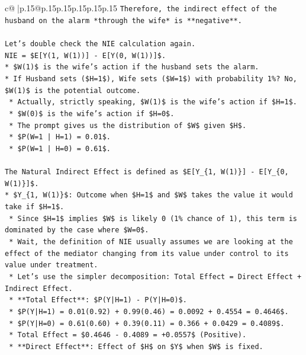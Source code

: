 \documentclass{article}
\begin{document}
{\begin{supertabular}{c@{$\;$}|p{.15\linewidth}@{}p{.15\linewidth}p{.15\linewidth}p{.15\linewidth}p{.15\linewidth}p{.15\linewidth}}
{{{\texttt{Therefore, the indirect effect of the husband on the alarm *through the wife* is **negative**.} \\
\\ 
\texttt{Let's double check the NIE calculation again.} \\
\texttt{NIE = \$E{[}Y(1, W(1)){]} {-} E{[}Y(0, W(1)){]}\$.} \\
\texttt{*   \$W(1)\$ is the wife's action if the husband sets the alarm.} \\
\texttt{*   If Husband sets (\$H=1\$), Wife sets (\$W=1\$) with probability 1\%? No, \$W(1)\$ is the potential outcome.} \\
\texttt{    *   Actually, strictly speaking, \$W(1)\$ is the wife's action if \$H=1\$.} \\
\texttt{    *   \$W(0)\$ is the wife's action if \$H=0\$.} \\
\texttt{    *   The prompt gives us the distribution of \$W\$ given \$H\$.} \\
\texttt{    *   \$P(W=1 | H=1) = 0.01\$.} \\
\texttt{    *   \$P(W=1 | H=0) = 0.61\$.} \\
\\ 
\texttt{The Natural Indirect Effect is defined as \$E{[}Y\_\{1, W(1)\}{]} {-} E{[}Y\_\{0, W(1)\}{]}\$.} \\
\texttt{*   \$Y\_\{1, W(1)\}\$: Outcome when \$H=1\$ and \$W\$ takes the value it would take if \$H=1\$.} \\
\texttt{    *   Since \$H=1\$ implies \$W\$ is likely 0 (1\% chance of 1), this term is dominated by the case where \$W=0\$.} \\
\texttt{    *   Wait, the definition of NIE usually assumes we are looking at the effect of the mediator changing from its value under control to its value under treatment.} \\
\texttt{    *   Let's use the simpler decomposition: Total Effect = Direct Effect + Indirect Effect.} \\
\texttt{    *   **Total Effect**: \$P(Y|H=1) {-} P(Y|H=0)\$.} \\
\texttt{        *   \$P(Y|H=1) = 0.01(0.92) + 0.99(0.46) = 0.0092 + 0.4554 = 0.4646\$.} \\
\texttt{        *   \$P(Y|H=0) = 0.61(0.60) + 0.39(0.11) = 0.366 + 0.0429 = 0.4089\$.} \\
\texttt{        *   Total Effect = \$0.4646 {-} 0.4089 = +0.0557\$ (Positive).} \\
\texttt{    *   **Direct Effect**: Effect of \$H\$ on \$Y\$ when \$W\$ is fixed.} \\
}}}
\end{supertabular}}
\end{document}
